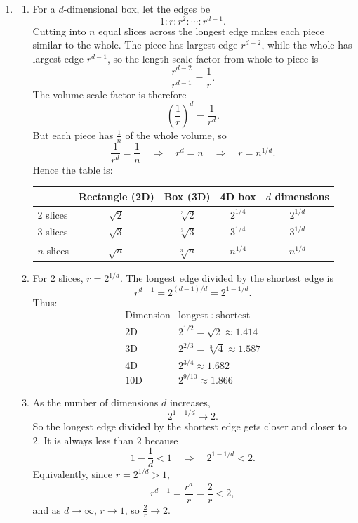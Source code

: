 \documentclass[11pt,a4paper]{article}
\begin{document}
\begin{enumerate}[label=\textbf{Q\arabic*.}, leftmargin=*, itemsep=1.2em]
\item
\begin{enumerate}[label=(\alph*)]
\item For a \(d\)-dimensional box, let the edges be
\[
1:r:r^2:\cdots:r^{d-1}.
\]
Cutting into \(n\) equal slices across the longest edge makes each piece similar to the whole. The piece has largest edge \(r^{d-2}\), while the whole has largest edge \(r^{d-1}\), so the length scale factor from whole to piece is
\[
\frac{r^{d-2}}{r^{d-1}}=\frac1r.
\]
The volume scale factor is therefore
\[
\left(\frac1r\right)^d=\frac1{r^d}.
\]
But each piece has \(\frac1n\) of the whole volume, so
\[
\frac1{r^d}=\frac1n
\quad\Longrightarrow\quad
r^d=n
\quad\Longrightarrow\quad
r=n^{1/d}.
\]
Hence the table is:
\begin{center}
\begin{tabular}{|l|c|c|c|c|}
\hline
 & Rectangle (2D) & Box (3D) & 4D box & \(d\) dimensions\\
\hline
2 slices & \(\sqrt2\) & \(\sqrt[3]{2}\) & \(2^{1/4}\) & \(2^{1/d}\)\\
\hline
3 slices & \(\sqrt3\) & \(\sqrt[3]{3}\) & \(3^{1/4}\) & \(3^{1/d}\)\\
\hline
\(n\) slices & \(\sqrt n\) & \(\sqrt[3]{n}\) & \(n^{1/4}\) & \(n^{1/d}\)\\
\hline
\end{tabular}
\end{center}

\item For \(2\) slices, \(r=2^{1/d}\). The longest edge divided by the shortest edge is
\[
r^{d-1}=2^{(d-1)/d}=2^{1-1/d}.
\]
Thus:
\[
\begin{array}{c|c}
\text{Dimension} & \text{longest}\div\text{shortest}\\
\hline
2\text{D} & 2^{1/2}=\sqrt2\approx 1.414\\
3\text{D} & 2^{2/3}=\sqrt[3]{4}\approx 1.587\\
4\text{D} & 2^{3/4}\approx 1.682\\
10\text{D} & 2^{9/10}\approx 1.866
\end{array}
\]

\item As the number of dimensions \(d\) increases,
\[
2^{1-1/d}\to 2.
\]
So the longest edge divided by the shortest edge gets closer and closer to \(2\). It is always less than \(2\) because
\[
1-\frac1d<1
\quad\Longrightarrow\quad
2^{1-1/d}<2.
\]
Equivalently, since \(r=2^{1/d}>1\),
\[
r^{d-1}=\frac{r^d}{r}=\frac2r<2,
\]
and as \(d\to\infty\), \(r\to1\), so \(\frac2r\to2\).
\end{enumerate}


\end{enumerate}
\end{document}
